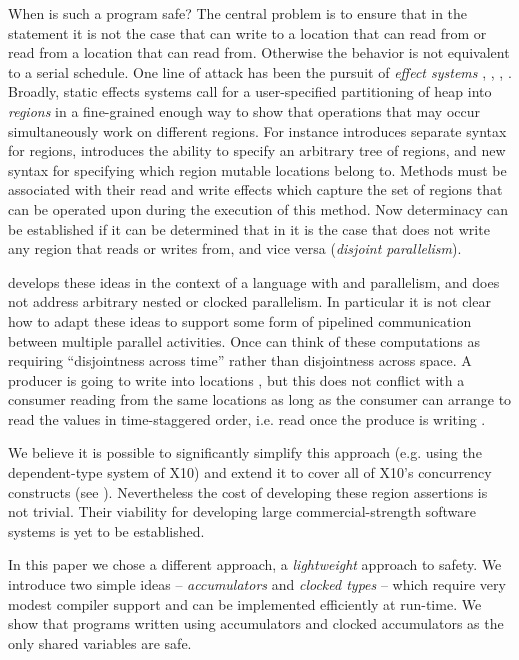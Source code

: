 When is such a program safe? The central problem
is to ensure that in the statement  it is not the
case that  can write to a location that  can read
from or read from a location that  can read from. Otherwise
the behavior is not equivalent to a serial schedule. One line of attack has been the pursuit
of {\em effect systems} \cite{Lucassen:1988:PES:73560.73564},
\cite{Leino:2002:UDG:543552.512559},
\cite{boyland:01interdependence},
\cite{DPJ}. Broadly, static effects systems call
for a user-specified partitioning of heap into {\em regions} in a
fine-grained enough way to show that operations that may occur
simultaneously work on different regions. For instance \cite{DPJ}
introduces separate syntax for regions, introduces the ability to
specify an arbitrary tree of regions, and new syntax for specifying
which region mutable locations belong to. Methods must be associated
with their read and write effects which capture the set of regions
that can be operated upon during the execution of this
method. Now determinacy can be established if it can be determined
that in  it is the case that  does
not write any region that  reads or writes from, and vice
versa ({\em disjoint parallelism}).

\cite{DPJ} develops these ideas in the context of a language with
 and  parallelism, and does not
address arbitrary nested or clocked parallelism.  In particular it is
not clear how to adapt these ideas to support some form of pipelined
communication between multiple parallel activities. Once can think of
these computations as requiring ``disjointness across time'' rather
than disjointness across space. A producer is going to write into
locations , but this does not
conflict with a consumer reading from the same locations as long as
the consumer can arrange to read the values in time-staggered order,
i.e. read  once the produce is writing .

We believe it is possible to significantly simplify this approach
(e.g.{} using the dependent-type system of X10) and extend it to cover
all of X10's concurrency constructs (see
). Nevertheless the cost of developing these
region assertions is not trivial. Their viability for developing large
commercial-strength software systems is yet to be established.

In this paper we chose a different approach, a {\em lightweight}
approach to safety. We introduce two simple ideas -- {\em
  accumulators} and {\em clocked types} -- which require very modest
compiler support and can be implemented efficiently at run-time. We
show that programs written using accumulators and clocked accumulators
as the only shared variables are safe.

